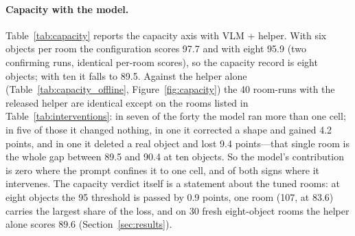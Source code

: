 \documentclass[10pt,a4paper]{article}
\begin{document}
\paragraph{Capacity with the model.}
Table~\ref{tab:capacity} reports the capacity axis with VLM + helper. With six objects per room the configuration scores 97.7 and with eight 95.9 (two confirming runs, identical per-room scores), so the capacity record is eight objects; with ten it falls to 89.5. Against the helper alone (Table~\ref{tab:capacity_offline}, Figure~\ref{fig:capacity}) the 40 room-runs with the released helper are identical except on the rooms listed in Table~\ref{tab:interventions}: in seven of the forty the model ran more than one cell; in five of those it changed nothing, in one it corrected a shape and gained 4.2 points, and in one it deleted a real object and lost 9.4 points---that single room is the whole gap between 89.5 and 90.4 at ten objects. So the model's contribution is zero where the prompt confines it to one cell, and of both signs where it intervenes. The capacity verdict itself is a statement about the tuned rooms: at eight objects the 95 threshold is passed by 0.9 points, one room (107, at 83.6) carries the largest share of the loss, and on 30 fresh eight-object rooms the helper alone scores 89.6 (Section~\ref{sec:results}).

\begin{table}[t]
\centering\small
\caption{Capacity axis with VLM + helper: seeds 101--110 rendered with an exact object count (Exact is out of 10). The first two runs at 6 and 8 objects predate the frame tie-breaker and tighter pairing of the released helper; the \texttt{-b}, \texttt{-confirm} and 10-object runs use the released helper (commit \texttt{d3b8a2d}). The 6- and 10-object entries are single runs.}
\label{tab:capacity}

\end{table}

\begin{table}[t]
\centering\small
\caption{Every capacity room-run with the released helper in which VLM + helper and helper alone differ or the model ran more than one cell (7 of 40). ``Objects returned'' is the length of the model's answer against the true count.}
\label{tab:interventions}

\end{table}
\end{document}
